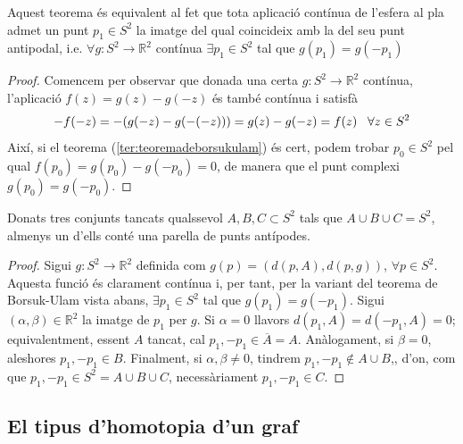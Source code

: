 \documentclass[../main.tex]{subfiles}
\begin{document}
\begin{coro}
Aquest teorema és equivalent al fet que tota aplicació contínua de l'esfera al pla admet un punt $p_1\in S^2$ la imatge del qual coincideix amb la del seu punt antipodal, i.e. $\forall g:S^2\rightarrow \mathbb{R}^2$ contínua $\exists p_1\in S^2$ tal que $g(p_1) = g(-p_1)$
\end{coro}
\begin{proof}
Comencem per observar que donada una certa $g:S^2\longrightarrow\mathbb{R}^2$ contínua, l'aplicació $f(z) = g(z)-g(-z)$ és també contínua i satisfà
\begin{equation}
    \notag
    -f(-z) = -(g(-z)-g(-(-z))) = g(z)-g(-z) = f(z)\;\;\;\forall z\in S^2
\end{equation}
Així, si el teorema (\ref{ter:teoremadeborsukulam}) és cert, podem trobar $p_0\in S^2$ pel qual $f(p_0) = g(p_0)-g(-p_0) = 0$, de manera que el punt complexi $g(p_0)=g(-p_0)$.
\end{proof}

\begin{ter}
\label{ter:lusternikschirelmann} Donats tres conjunts tancats qualssevol $A,B,C\subset S^2$ tals que $A\cup B\cup C = S^2$, almenys un d'ells conté una parella de punts antípodes.
\end{ter}
\begin{proof}
Sigui $g:S^2\rightarrow \mathbb{R}^2$ definida com $g(p) = (d(p,A),d(p,g))$, $\forall p\in S^2$. Aquesta funció és clarament contínua i, per tant, per la variant del teorema de Borsuk-Ulam vista abans, $\exists p_1\in S^2$ tal que $g(p_1)=g(-p_1)$. Sigui $(\alpha,\beta)\in\mathbb{R}^2$ la imatge de $p_1$ per $g$. Si $\alpha = 0$ llavors $d(p_1,A) = d(-p_1,A)=0$; equivalentment, essent $A$ tancat, cal $p_1,-p_1\in\overline{A}=A$. Anàlogament, si $\beta = 0$, aleshores $p_1,-p_1\in B$. Finalment, si $\alpha,\beta\not=0$, tindrem $p_1,-p_1\not\in A\cup B$,, d'on, com que $p_1,-p_1\in S^2=A\cup B\cup C$, necessàriament $p_1,-p_1\in C$.
\end{proof}


\subsection{El tipus d'homotopia d'un graf}
\end{document}
